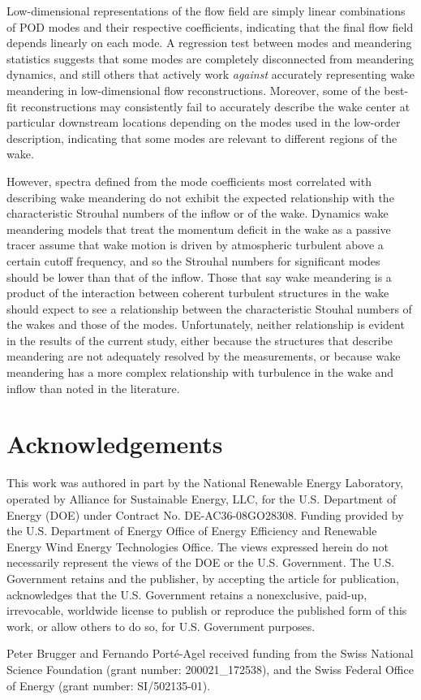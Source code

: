 \documentclass[aip,amsmath,amssymb,preprint,]{revtex4-1}
\begin{document}
Low-dimensional representations of the flow field are simply linear combinations of POD modes and their respective coefficients, indicating that the final flow field depends linearly on each mode.
A regression test between modes and meandering statistics suggests that some modes are completely disconnected from meandering dynamics, and still others that actively work \emph{against} accurately representing wake meandering in low-dimensional flow reconstructions.
Moreover, some of the best-fit reconstructions may consistently fail to accurately describe the wake center at particular downstream locations depending on the modes used in the low-order description, indicating that some modes are relevant to different regions of the wake.

However, spectra defined from the mode coefficients most correlated with describing wake meandering do not exhibit the expected relationship with the characteristic Strouhal numbers of the inflow or of the wake.
Dynamics wake meandering models that treat the momentum deficit in the wake as a passive tracer assume that wake motion is driven by atmospheric turbulent above a certain cutoff frequency, and so the Strouhal numbers for significant modes should be lower than that of the inflow.
Those that say wake meandering is a product of the interaction between coherent turbulent structures in the wake should expect to see a relationship between the characteristic Stouhal numbers of the wakes and those of the modes.
Unfortunately, neither relationship is evident in the results of the current study, either because the structures that describe meandering are not adequately resolved by the measurements, or because wake meandering has a more complex relationship with turbulence in the wake and inflow than noted in the literature.





\section*{Acknowledgements}

This work was authored in part by the National Renewable Energy Laboratory, operated by Alliance for Sustainable Energy, LLC, for the U.S. Department of Energy (DOE) under Contract No. DE-AC36-08GO28308. Funding provided by the U.S. Department of Energy Office of Energy Efficiency and Renewable Energy Wind Energy Technologies Office. The views expressed herein do not necessarily represent the views of the DOE or the U.S. Government. The U.S. Government retains and the publisher, by accepting the article for publication, acknowledges that the U.S. Government retains a nonexclusive, paid-up, irrevocable, worldwide license to publish or reproduce the published form of this work, or allow others to do so, for U.S. Government purposes. 

Peter Brugger and Fernando Porté-Agel received funding from the Swiss National Science Foundation (grant number: 200021\_172538), and the Swiss Federal Office of Energy (grant number: SI/502135-01).


\end{document}
